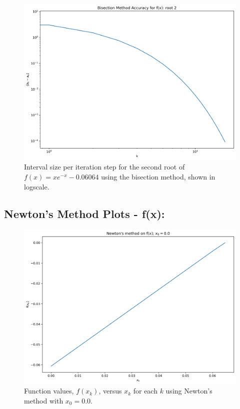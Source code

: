 \documentclass[11pt]{article}
\begin{document}
\begin{figure}[H]
	\centering
	\includegraphics[width=\linewidth]{../figures/Bisection_f_root2}
	\caption{Interval size per iteration step for the second root of $f(x) = xe^{-x} - 0.06064$ using the bisection method, shown in logscale.}
	\label{fig:bisec_f2}
\end{figure}

\subsection{Newton's Method Plots - f(x):}
\begin{figure}[H]
	\centering
	\includegraphics[width=\linewidth]{../figures/Newtons_f_0.0}
	\caption{Function values, $f(x_k)$, versus $x_k$ for each $k$ using Newton's method with $x_0 = 0.0$.}
	\label{fig:newton_f_0.0}
\end{figure}
\end{document}
